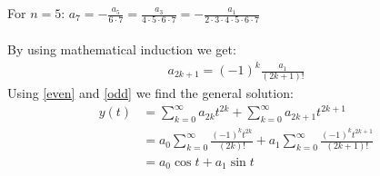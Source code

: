 \documentclass{article}
\begin{document}
For $n = 5: \, a_7 = -\frac{a_5}{6\cdot7} = \frac{a_3}{4\cdot5\cdot6\cdot7} = -\frac{a_1}{2\cdot3\cdot4\cdot5\cdot6\cdot7}$\\ \\ 
By using mathematical induction we get:
\begin{align*}
    a_{2k+1} = (-1)^k\frac{a_1}{(2k+1)!} \tag{2} \label{odd} 
\end{align*}
Using \eqref{even} and \eqref{odd} we find the general solution: \\
\begin{align*}
    y(t) &= \sum_{k = 0}^{\infty}a_{2k}t^{2k}+\sum_{k = 0}^{\infty}a_{2k+1}t^{2k+1} \\
    &= a_0\sum_{k = 0}^{\infty}\frac{(-1)^kt^{2k}}{(2k)!}+a_1\sum_{k = 0}^{\infty}\frac{(-1)^kt^{2k+1}}{(2k+1)!} \\
    &= a_0\cos t + a_1\sin t
\end{align*}

\newpage
\end{document}

